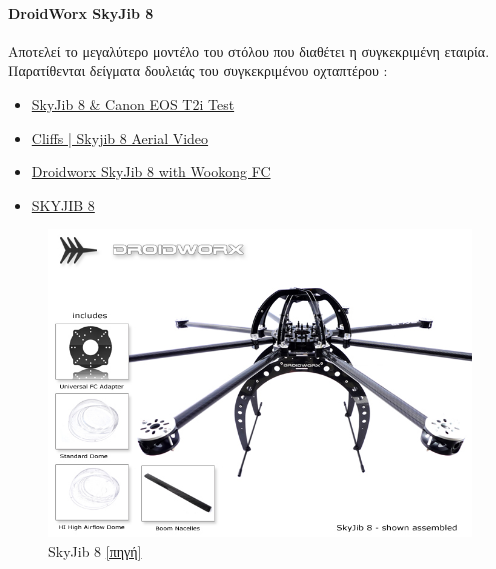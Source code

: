 \documentclass[a4paper, 12pt, twoside]{report}
\begin{document}
{{{{{{			\paragraph{DroidWorx SkyJib 8}{Αποτελεί το μεγαλύτερο μοντέλο του στόλου που διαθέτει η συγκεκριμένη εταιρία. Παρατίθενται δείγματα δουλειάς του συγκεκριμένου οχταπτέρου :
				\begin{itemize}
					\item \href{http://www.youtube.com/watch?v=1v4nffpEJKk}{SkyJib 8 \& Canon EOS T2i Test}
					\item \href{http://www.youtube.com/watch?v=eKXqiZfgXcQ}{Cliffs | Skyjib 8 Aerial Video}
					\item \href{https://vimeo.com/29674297}{Droidworx SkyJib 8 with Wookong FC}
					\item \href{https://vimeo.com/28055188}{SKYJIB 8}
				\end{itemize}
			}
			\begin{figure}[hp]
					\centering
					\includegraphics[scale=0.50]{DroidWrox_Skyjib8.png}
					\caption{SkyJib 8 \href{http://mikrokopter.altigator.com/images/droidworx/SkyJib-8b.jpg}{[πηγή]}}
					\label{φωτ:SkyJib 8}
			\end{figure}

			\begin{landscape}	
			\setlength\LTleft{0pt}            %
			\setlength\LTright{0pt}           %
	

\end{landscape}}}}}}}
\end{document}

